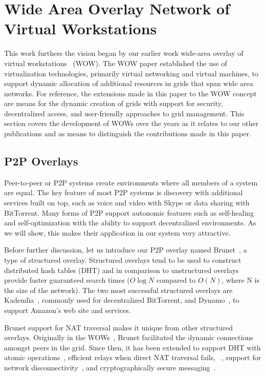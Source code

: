 \documentclass[conference]{IEEEtran}
\begin{document}
\section{Wide Area Overlay Network of Virtual Workstations}

This work furthers the vision began by our earlier work wide-area overlay of
virtual workstations~\cite{wow} (WOW).  The WOW paper established the use of
virtualization technologies, primarily virtual networking and virtual machines,
to support dynamic allocation of additional resources in grids that span wide
area networks.  For reference, the extensions made in this paper to the WOW
concept are means for the dynamic creation of grids with support for security,
decentralized access, and user-friendly approaches to grid management.  This
section covers the development of WOWs over the years as it relates to our
other publications and as means to distinguish the contributions made in this
paper.

\subsection{P2P Overlays}

Peer-to-peer or P2P systems create environments where all members of a system
are equal.  The key feature of most P2P systems is discovery with additional
services built on top, such as voice and video with Skype or data sharing with
BitTorrent.  Many forms of P2P support autonomic features such as self-healing
and self-optimization with the ability to support decentralized environments.
As we will show, this makes their application in our system very attractive.

Before further discussion, let us introduce our P2P overlay named
Brunet~\cite{brunet}, a type of structured overlay.  Structured overlays tend
to be used to construct distributed hash tables (DHT) and in comparison to
unstructured overlays provide faster guaranteed search times ($O\log N$
compared to $O(N)$, where N is the size of the network).  The two most
successful structured overlays are Kademlia~\cite{kademlia}, commonly used for
decentralized BitTorrent, and Dynamo~\cite{dynamo}, to support Amazon's web
site and services.

Brunet support for NAT traversal makes it unique from other structured
overlays.  Originally in the WOWs~\cite{wow}, Brunet facilitated the dynamic
connections amongst peers in the grid.  Since then, it has been extended to
support DHT with atomic operations~\cite{pcgrid}, efficient relays when direct
NAT traversal fails, ~\cite{groupvpn}, support for network
disconnectivity~\cite{hpdc08}, and cryptographically secure
messaging~\cite{groupvpn}.
\end{document}
